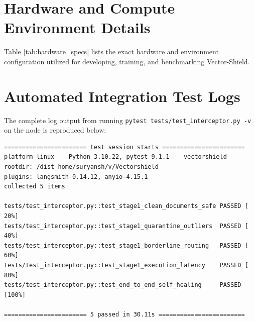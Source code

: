 \label{chap:appendix}
\section{Hardware and Compute Environment Details}
Table \ref{tab:hardware_specs} lists the exact hardware and environment configuration utilized for developing, training, and benchmarking Vector-Shield.

\begin{table}[htbp]
\centering
\caption{Vector-Shield Hardware Infrastructure Specifications}
\label{tab:hardware_specs}
\end{table}

\section{Automated Integration Test Logs}
The complete log output from running \texttt{pytest tests/test\_interceptor.py -v} on the node is reproduced below:

\begin{footnotesize}
\begin{verbatim}
======================= test session starts =======================
platform linux -- Python 3.10.22, pytest-9.1.1 -- vectorshield
rootdir: /dist_home/suryansh/v/Vectorshield
plugins: langsmith-0.14.12, anyio-4.15.1
collected 5 items

tests/test_interceptor.py::test_stage1_clean_documents_safe PASSED [ 20%]
tests/test_interceptor.py::test_stage1_quarantine_outliers  PASSED [ 40%]
tests/test_interceptor.py::test_stage1_borderline_routing   PASSED [ 60%]
tests/test_interceptor.py::test_stage1_execution_latency    PASSED [ 80%]
tests/test_interceptor.py::test_end_to_end_self_healing     PASSED [100%]

======================= 5 passed in 30.11s ========================
\end{verbatim}
\end{footnotesize}

